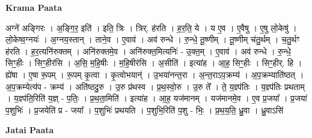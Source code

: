 \documentclass[17pt]{extarticle}
\begin{document}
\textbf{Krama Paata} \newline

अग्ने॑ अङ्‍गिरः । अ॒ङ्‍गि॒र॒ इति॑ । इति॒ त्रिः । त्रिर्. ह॑रति । ह॒र॒ति॒ ये । य ए॒व । ए॒वैषु । ए॒षु लो॒केषु॑ । लो॒केष्व॒ग्नयः॑ । अ॒ग्नय॒स्तान् । ताने॒व । ए॒वाव॑ । अव॑ रुन्धे । रु॒न्धे॒ तू॒ष्णीम् । तू॒ष्णीम् च॑तु॒र्थम् । च॒तु॒र्थꣳ ह॑रति । ह॒र॒त्यनि॑रुक्तम् । अनि॑रुक्तमे॒व । अनि॑रुक्त॒मित्यनिः॑ - उ॒क्त॒म् । ए॒वाव॑ । अव॑ रुन्धे । रु॒न्धे॒ सिꣳ॒॒हीः । सिꣳ॒॒हीर॑सि । अ॒सि॒ म॒हि॒षीः । म॒हि॒षीर॑सि । अ॒सीति॑ । इत्या॑ह । आ॒ह॒ सिꣳ॒॒हीः । सिꣳ॒॒हीर्. हि । ह्ये॑षा । ए॒षा रू॒पम् । रू॒पम् कृ॒त्वा । कृ॒त्वोभयान्॑ । उ॒भया॑नन्त॒रा । अ॒न्त॒राऽप॒क्रम्य॑ । अ॒प॒क्रम्याति॑ष्ठत् । अ॒प॒क्रम्येत्य॑प - क्रम्य॑ । अति॑ष्ठदु॒रु । उ॒रु प्र॑थस्व । प्र॒थ॒स्वो॒रु । उ॒रु ते᳚ । ते॒ य॒ज्ञ्प॑तिः । य॒ज्ञ्प॑तिः प्रथताम् । य॒ज्ञ्प॑ति॒रिति॑ य॒ज्ञ् - प॒तिः॒ । प्र॒थ॒ता॒मिति॑ । इत्या॑ह । आ॒ह॒ यज॑मानम् । यज॑मानमे॒व । ए॒व प्र॒जया᳚ । प्र॒जया॑ प॒शुभिः॑ । प्र॒जयेति॑ प्र - जया᳚ । प॒शुभिः॑ प्रथयति । प॒शुभि॒रिति॑ प॒शु - भिः॒ । प्र॒थ॒य॒ति॒ ध्रु॒वा । ध्रु॒वाऽसि॑ \newline

\textbf{Jatai Paata} \newline
\end{document}
